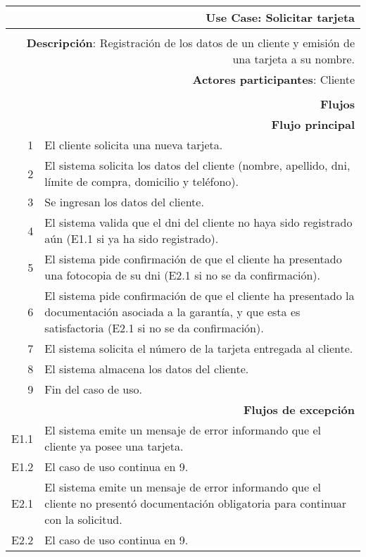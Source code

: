 \begin{tabularx}{\textwidth}{| r | X |}
\hline
\multicolumn{2}{|X|}{
\textbf{Use Case}: Solicitar tarjeta} \\

\hline
\multicolumn{2}{|c|}{\cellcolor[gray]{0.6}} \\

\hline
\multicolumn{2}{|X|}{
\textbf{Descripción}: Registración de los datos de un cliente y emisión de una
tarjeta a su nombre.} \\

\hline
\multicolumn{2}{|X|}{
\textbf{Actores participantes}: Cliente} \\

\hline
\multicolumn{2}{|c|}{\cellcolor[gray]{0.6} } \\

\hline
\multicolumn{2}{|X|}{
\textbf{Flujos}} \\

\hline
\multicolumn{2}{|X|}{
\textbf{Flujo principal}} \\

\hline
1 & El cliente solicita una nueva tarjeta. \\
\hline
2 & El sistema solicita los datos del cliente (nombre, apellido, dni, límite de
compra, domicilio y teléfono). \\
\hline
3 & Se ingresan los datos del cliente. \\
\hline
4 & El sistema valida que el dni del cliente no haya sido registrado aún (E1.1
si ya ha sido registrado). \\
\hline
5 & El sistema pide confirmación de que el cliente ha presentado una fotocopia
de su dni (E2.1 si no se da confirmación). \\
\hline
6 & El sistema pide confirmación de que el cliente ha presentado la
documentación asociada a la garantía, y que esta es satisfactoria (E2.1 si no se
da confirmación). \\
\hline
7 & El sistema solicita el número de la tarjeta entregada al cliente. \\
\hline
8 & El sistema almacena los datos del cliente. \\
\hline
9 & Fin del caso de uso. \\

\hline
\multicolumn{2}{|X|}{
\textbf{Flujos de excepción}} \\

\hline
E1.1 & El sistema emite un mensaje de error informando que el cliente ya posee
una tarjeta. \\
\hline
E1.2 & El caso de uso continua en 9.\\

\hline
E2.1 & El sistema emite un mensaje de error informando que el cliente no
presentó documentación obligatoria para continuar con la solicitud. \\
\hline
E2.2 & El caso de uso continua en 9. \\

\hline
\end{tabularx}

